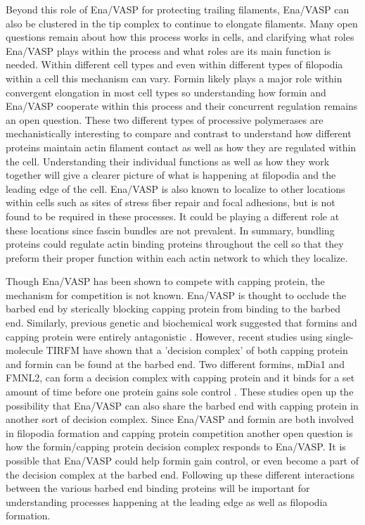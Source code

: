 Beyond this role of Ena/VASP for protecting trailing filaments, Ena/VASP can also be clustered in the tip complex to continue to elongate filaments. Many open questions remain about how this process works in cells, and clarifying what roles Ena/VASP plays within the process and what roles are its main function is needed. Within different cell types and even within different types of filopodia within a cell this mechanism can vary. Formin likely plays a major role within convergent elongation in most cell types so understanding how formin and Ena/VASP cooperate within this process and their concurrent regulation remains an open question. These two different types of processive polymerases are mechanistically interesting to compare and contrast to understand how different proteins maintain actin filament contact as well as how they are regulated within the cell. Understanding their individual functions as well as how they work together will give a clearer picture of what is happening at filopodia and the leading edge of the cell. Ena/VASP is also known to localize to other locations within cells such as sites of stress fiber repair and focal adhesions, but is not found to be required in these processes. It could be playing a different role at these locations since fascin bundles are not prevalent. In summary, bundling proteins could regulate actin binding proteins throughout the cell so that they preform their proper function within each actin network to which they localize. 

Though Ena/VASP has been shown to compete with capping protein, the mechanism for competition is not known. Ena/VASP is thought to occlude the barbed end by sterically blocking capping protein from binding to the barbed end. Similarly, previous genetic and biochemical work suggested that formins and capping protein were entirely antagonistic \citep{kovar_profilin-mediated_2005}. However, recent studies using single-molecule TIRFM have shown that a 'decision complex' of both capping protein and formin can be found at the barbed end. Two different formins, mDia1 and FMNL2, can form a decision complex with capping protein and it binds for a set amount of time before one protein gains sole control \citep{bombardier_single-molecule_2015,shekhar_formin_2015}. These studies open up the possibility that Ena/VASP can also share the barbed end with capping protein in another sort of decision complex. Since Ena/VASP and formin are both involved in filopodia formation and capping protein competition another open question is how the formin/capping protein decision complex responds to Ena/VASP. It is possible that Ena/VASP could help formin gain control, or even become a part of the decision complex at the barbed end. Following up these different interactions between the various barbed end binding proteins will be important for understanding processes happening at the leading edge as well as filopodia formation. 

